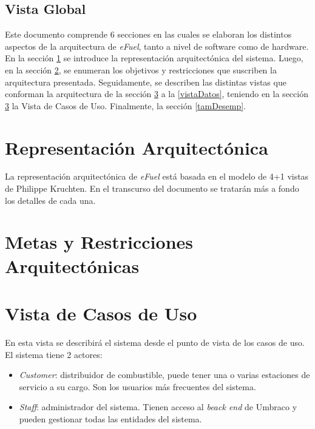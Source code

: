 \documentclass{article}
\begin{document}
    \subsection{Vista Global}
    Este documento comprende 6 secciones en las cuales se elaboran los distintos aspectos de la arquitectura de \emph{eFuel}, tanto a nivel de software como de hardware. En la sección \ref{reprArq} se introduce la representación arquitectónica del sistema. Luego, en la sección \ref{metasArq}, se enumeran los objetivos y restricciones que suscriben la arquitectura presentada. Seguidamente, se describen las distintas vistas que conforman la arquitectura de la sección \ref{vistaCasosDeUso} a la \ref{vistaDatos}, teniendo en la sección \ref{vistaCasosDeUso} la Vista de Casos de Uso. Finalmente, la sección \ref{tamDesemp}.


    \section{Representación Arquitectónica} \label{reprArq}
    La representación arquitectónica de \emph{eFuel} está basada en el modelo de 4+1 vistas de Philippe Kruchten. En el transcurso del documento se tratarán más a fondo los detalles de cada una.

    \section{Metas y Restricciones Arquitectónicas} \label{metasArq}

    
    \section{Vista de Casos de Uso} \label{vistaCasosDeUso}
    En esta vista se describirá el sistema desde el punto de vista de los casos de uso. El sistema tiene 2 actores:

    \begin{itemize}
        \item \emph{Customer}: distribuidor de combustible, puede tener una o varias estaciones de servicio a su cargo. Son los usuarios más frecuentes del sistema.
        \item \emph{Staff}: administrador del sistema. Tienen acceso al \emph{beack end} de Umbraco y pueden gestionar todas las entidades del sistema.
    \end{itemize}
\end{document}
